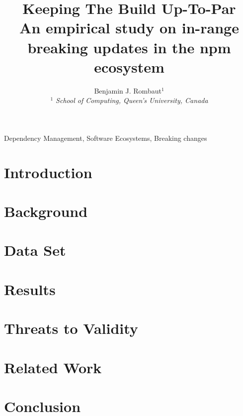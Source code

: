 \documentclass[10pt, conference]{IEEEtran}
\title{
    Keeping The Build Up-To-Par\\
    \huge An empirical study on in-range breaking updates in the npm ecosystem
}
\author{Benjamin J. Rombaut$^{1}$
    \\
    \emph{
        $^{1}$ School of Computing, Queen's University, Canada
    }
}
\begin{document}
\maketitle


\begin{IEEEkeywords}
    Dependency Management, Software Ecosystems, Breaking changes
\end{IEEEkeywords}

\section{Introduction}
\label{sec:introduction}


\section{Background}
\label{sec:background}


% 

\section{Data Set}
\label{sec:data}


\section{Results}
\label{sec:results}




\section{Threats to Validity}
\label{sec:threats}


\section{Related Work}
\label{sec:relatedwork}


\section{Conclusion}
\label{sec:conclusion}



\balance


\end{document}
